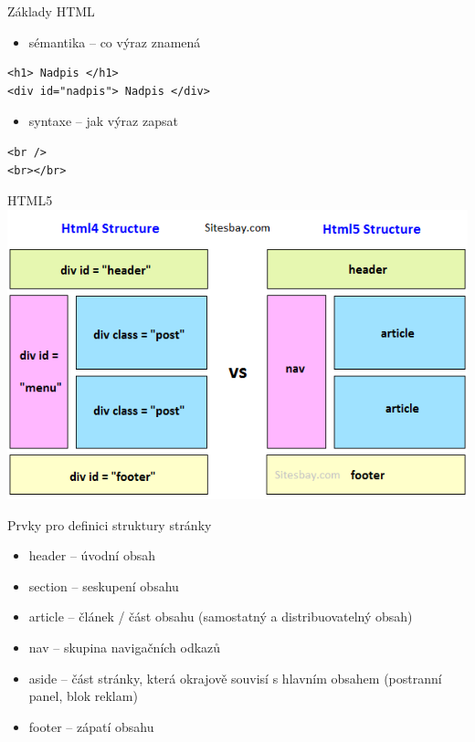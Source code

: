 \documentclass{beamer}
\begin{document}
\begin{frame}[fragile]{Základy HTML}

\begin{itemize}
	\item sémantika -- co výraz znamená

\end{itemize}
\begin{lstlisting}[language=HTML5]
<h1> Nadpis </h1>
<div id="nadpis"> Nadpis </div>
\end{lstlisting}
	
	\begin{itemize}

	\item syntaxe -- jak výraz zapsat
\end{itemize}
\begin{lstlisting}[language=HTML5]
<br />
<br></br>
\end{lstlisting}

\end{frame}

\begin{frame}{HTML5}
	  \includegraphics[width=\columnwidth]{html4-vs-html5}
\end{frame}


\begin{frame}{Prvky pro definici struktury stránky}
	\begin{itemize}
		\item header -- úvodní obsah
		\item section -- seskupení obsahu
		\item article -- článek / část obsahu (samostatný a distribuovatelný obsah)
		\item nav -- skupina navigačních odkazů
		\item aside -- část stránky, která okrajově souvisí s hlavním obsahem
		(postranní panel, blok reklam)
		\item footer -- zápatí obsahu 
	\end{itemize}
\end{frame}
\end{document}
